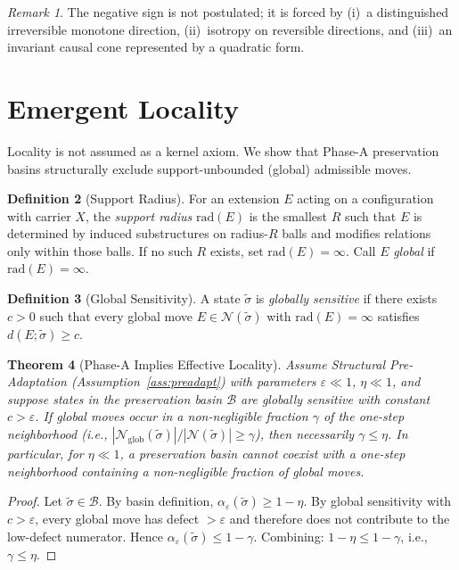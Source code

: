 \documentclass[11pt,a4paper]{article}
\newtheorem{theorem}{Theorem}[section]
\theoremstyle{definition}
\newtheorem{definition}[theorem]{Definition}
\theoremstyle{remark}
\newtheorem{remark}[theorem]{Remark}
\begin{document}
\begin{remark}
The negative sign is not postulated; it is forced by (i)~a distinguished irreversible monotone direction, (ii)~isotropy on reversible directions, and (iii)~an invariant causal cone represented by a quadratic form.
\end{remark}

\section{Emergent Locality}

Locality is not assumed as a kernel axiom. We show that Phase-A preservation basins structurally exclude support-unbounded (global) admissible moves.

\begin{definition}[Support Radius]\label{def:supp}
For an extension $E$ acting on a configuration with carrier $X$, the \emph{support radius} $\mathrm{rad}(E)$ is the smallest $R$ such that $E$ is determined by induced substructures on radius-$R$ balls and modifies relations only within those balls. If no such $R$ exists, set $\mathrm{rad}(E) = \infty$. Call $E$ \emph{global} if $\mathrm{rad}(E) = \infty$.
\end{definition}

\begin{definition}[Global Sensitivity]\label{def:sens}
A state $\tilde{\sigma}$ is \emph{globally sensitive} if there exists $c > 0$ such that every global move $E \in \mathcal{N}(\tilde{\sigma})$ with $\mathrm{rad}(E) = \infty$ satisfies $d(E; \tilde{\sigma}) \geq c$.
\end{definition}

\begin{theorem}[Phase-A Implies Effective Locality]\label{thm:locality}
Assume Structural Pre-Adaptation (Assumption~\ref{ass:preadapt}) with parameters $\varepsilon \ll 1$, $\eta \ll 1$, and suppose states in the preservation basin $\mathcal{B}$ are globally sensitive with constant $c > \varepsilon$. If global moves occur in a non-negligible fraction $\gamma$ of the one-step neighborhood (i.e., $|\mathcal{N}_{\mathrm{glob}}(\tilde{\sigma})|/|\mathcal{N}(\tilde{\sigma})| \geq \gamma$), then necessarily $\gamma \leq \eta$. In particular, for $\eta \ll 1$, a preservation basin cannot coexist with a one-step neighborhood containing a non-negligible fraction of global moves.
\end{theorem}
\begin{proof}
Let $\tilde{\sigma} \in \mathcal{B}$. By basin definition, $\alpha_\varepsilon(\tilde{\sigma}) \geq 1 - \eta$. By global sensitivity with $c > \varepsilon$, every global move has defect $> \varepsilon$ and therefore does not contribute to the low-defect numerator. Hence $\alpha_\varepsilon(\tilde{\sigma}) \leq 1 - \gamma$. Combining: $1 - \eta \leq 1 - \gamma$, i.e., $\gamma \leq \eta$.
\end{proof}
\end{document}
